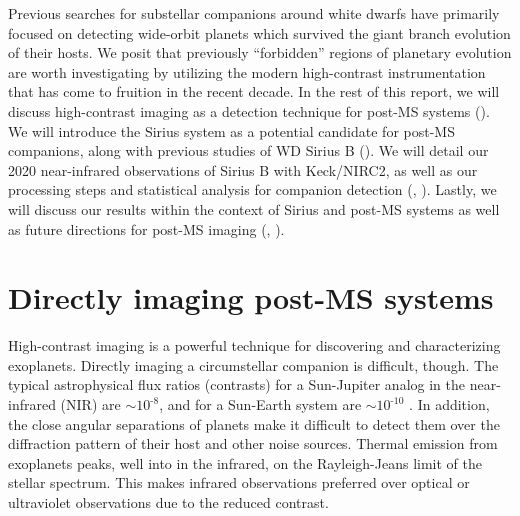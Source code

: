 \documentclass[twocolumn]{aastex631}
\begin{document}
Previous searches for substellar companions around white dwarfs \citep[e.g.,][]{hoganDODOSurveyII2009,luhmanDiscoveryCandidateCoolest2011,xuExtremeAOSearchGiant2015a} have primarily focused on detecting wide-orbit planets which survived the giant branch evolution of their hosts. We posit that previously ``forbidden'' regions of planetary evolution are worth investigating by utilizing the modern high-contrast instrumentation that has come to fruition in the recent decade. In the rest of this report, we will discuss high-contrast imaging as a detection technique for post-MS systems (). We will introduce the Sirius system as a potential candidate for post-MS companions, along with previous studies of WD Sirius B (). We will detail our 2020 near-infrared observations of Sirius B with Keck/NIRC2, as well as our processing steps and statistical analysis for companion detection (, ). Lastly, we will discuss our results within the context of Sirius and post-MS systems as well as future directions for post-MS imaging (, ).


\section{Directly imaging post-MS systems} \label{sec:imaging}

High-contrast imaging is a powerful technique for discovering and characterizing exoplanets. Directly imaging a circumstellar companion is difficult, though. The typical astrophysical flux ratios (contrasts) for a Sun-Jupiter analog in the near-infrared (NIR) are $\sim$$10^{\text{-}8}$, and for a Sun-Earth system are $\sim$$10^{\text{-}10}$ \citep{traubDirectImagingExoplanets2010}. In addition, the close angular separations of planets make it difficult to detect them over the diffraction pattern of their host and other noise sources. Thermal emission from exoplanets peaks, well into in the infrared, on the Rayleigh-Jeans limit of the stellar spectrum. This makes infrared observations preferred over optical or ultraviolet observations due to the reduced contrast.
\end{document}

